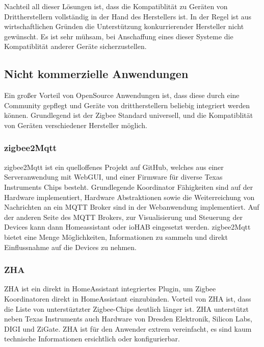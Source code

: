 Nachteil all dieser Lösungen ist, dass die Kompatiblität zu Geräten von Drittherstellern vollständig in der Hand des Herstellers ist. In der Regel ist aus
wirtschaftlichen Gründen die Unterstützung konkurrierender Hersteller nicht gewünscht. Es ist sehr mühsam, bei Anschaffung eines dieser Systeme die Kompatiblität
anderer Geräte sicherzustellen.

\subsection{Nicht kommerzielle Anwendungen}

Ein großer Vorteil von OpenSource Anwendungen ist, dass diese durch eine Community gepflegt und Geräte von drittherstellern beliebig integriert werden können.
Grundlegend ist der Zigbee Standard universell, und die Kompatiblität von Geräten verschiedener Hersteller möglich.



\subsubsection{zigbee2Mqtt}

zigbee2Mqtt ist ein quelloffenes Projekt auf GitHub, welches aus einer Serveranwendung mit WebGUI, und einer Firmware für diverse Texas Instruments Chips besteht.
Grundlegende Koordinator Fähigkeiten sind auf der Hardware implementiert, Hardware Abstraktionen sowie die Weiterreichung von Nachrichten an ein MQTT Broker sind
in der Webanwendung implementiert. Auf der anderen Seite des MQTT Brokers, zur Visualisierung und Steuerung der Devices kann dann Homeassistant oder ioHAB eingesetzt
werden. zigbee2Mqtt bietet eine Menge Möglichkeiten, Informationen zu sammeln und direkt Einflussnahme auf die Devices zu nehmen.

\subsubsection{ZHA}
ZHA ist ein direkt in HomeAssistant integriertes Plugin, um Zigbee Koordinatoren direkt in HomeAssistant einzubinden. Vorteil
von ZHA ist, dass die Liste von unterstüztzter Zigbee-Chips deutlich länger ist. ZHA unterstützt neben Texas Instruments auch Hardware von Dresden Elektronik,
Silicon Labs, DIGI und ZiGate. ZHA ist für den Anwender extrem vereinfacht, es sind kaum technische Informationen ersichtlich oder konfigurierbar. 







